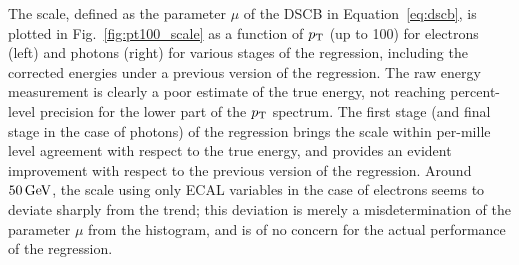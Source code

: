 The scale, defined as the parameter $\mu$ of the DSCB in Equation~\ref{eq:dscb}, is plotted in Fig.~\ref{fig:pt100_scale} as a function of $p_\mathrm{T}$ (up to 100\GeV) for electrons (left) and photons (right) for various stages of the regression, including the corrected energies under a previous version of the regression.
% 
The raw energy measurement is clearly a poor estimate of the true energy, not reaching percent-level precision for the lower part of the $p_\mathrm{T}$ spectrum.
% 
The first stage (and final stage in the case of photons) of the regression brings the scale within per-mille level agreement with respect to the true energy, and provides an evident improvement with respect to the previous version of the regression.
% 
Around $50\,\text{GeV}$, the scale using only ECAL variables in the case of electrons seems to deviate sharply from the trend; this deviation is merely a misdetermination of the parameter $\mu$ from the histogram, and is of no concern for the actual performance of the regression.
% 


